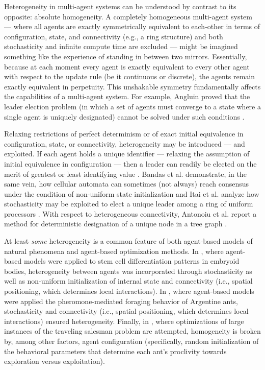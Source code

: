 Heterogeneity in multi-agent systems can be understood by contrast to its opposite: absolute homogeneity.
A completely homogeneous multi-agent system --- where all agents are exactly symmetrically equivalent to each-other in terms of configuration, state, and connectivity (e.g., a ring structure) and both stochasticity and infinite compute time are excluded --- might be imagined something like the experience of standing in between two mirrors.
Essentially, because at each moment every agent is exactly equivalent to every other agent with respect to the update rule (be it continuous or discrete), the agents remain exactly equivalent in perpetuity.
This unshakable symmetry fundamentally affects the capabilities of a multi-agent system.
For example, Angluin proved that the leader election problem (in which a set of agents must converge to a state where a single agent is uniquely designated) cannot be solved under such conditions \cite{angluin1980local,banda2015configuration}.

Relaxing restrictions of perfect determinism or of exact initial equivalence in configuration, state, or connectivity, heterogeneity may be introduced --- and exploited.
If each agent holds a unique identifier --- relaxing the assumption of initial equivalence in configuration --- then a leader can readily be elected on the merit of greatest or least identifying value \cite{frederickson1987electing}.
Bandas et al. demonstrate, in the same vein, how cellular automata can sometimes (not always) reach consensus under the condition of non-uniform state initialization \cite{banda2015configuration} and Itai et al. analyze how stochasticity may be exploited to elect a unique leader among a ring of uniform processors \cite{itai1981symmetry}.
With respect to heterogeneous connectivity, Antonoiu et al. report a method for deterministic designation of a unique node in a tree graph \cite{antonoiu1996self}.

At least \textit{some} heterogeneity is a common feature of both agent-based models of natural phenomena and agent-based optimization methods.
In \cite{atodd2015quantitative}, where agent-based models were applied to stem cell differentiation patterns in embryoid bodies, heterogeneity between agents was incorporated through stochasticity as well as non-uniform initialization of internal state and connectivity (i.e., spatial positioning, which determines local interactions).
In \cite{perna2012individual}, where agent-based models were applied the pheromone-mediated foraging behavior of Argentine ants, stochasticity and connectivity (i.e., spatial positioning, which determines local interactions) ensured heterogeneity.
Finally, in \cite{fayeez2017h}, where optimizations of large instances of the traveling salesman problem are attempted, homogeneity is broken by, among other factors, agent configuration (specifically, random initialization of the behavioral parameters that determine each ant's proclivity towards exploration versus exploitation).

